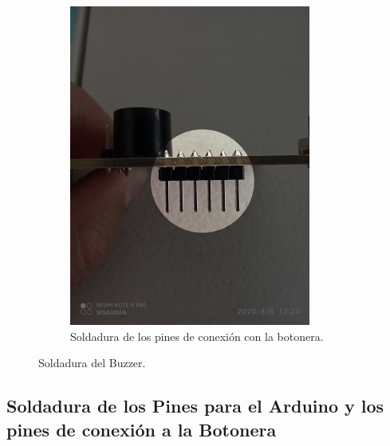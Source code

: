 \documentclass{article}
\begin{document}
\begin{figure}[H]
\begin{subfigure}[t]{0.3\textwidth}
        \includegraphics[width=0.9\columnwidth, height=1.2\columnwidth]{images/CPU/cpu_pines_botonera_1.png}
        \caption{Soldadura de los pines de conexión con la botonera.}
        \label{fig:cpu_pines_botonera_1}
    \end{subfigure}
    \caption{Soldadura del Buzzer.}
    \label{fig:cpu_buzzer}
\end{figure}

\subsection{Soldadura de los Pines para el Arduino y los pines de conexión a la Botonera}
\end{document}

